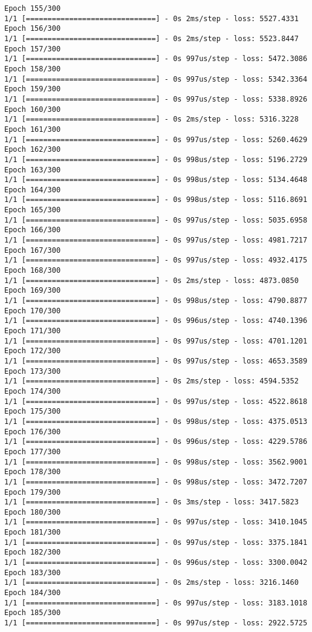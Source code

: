\documentclass[11pt]{article}
\begin{document}
\begin{Verbatim}[commandchars=\\\{\}]
Epoch 155/300
1/1 [==============================] - 0s 2ms/step - loss: 5527.4331
Epoch 156/300
1/1 [==============================] - 0s 2ms/step - loss: 5523.8447
Epoch 157/300
1/1 [==============================] - 0s 997us/step - loss: 5472.3086
Epoch 158/300
1/1 [==============================] - 0s 997us/step - loss: 5342.3364
Epoch 159/300
1/1 [==============================] - 0s 997us/step - loss: 5338.8926
Epoch 160/300
1/1 [==============================] - 0s 2ms/step - loss: 5316.3228
Epoch 161/300
1/1 [==============================] - 0s 997us/step - loss: 5260.4629
Epoch 162/300
1/1 [==============================] - 0s 998us/step - loss: 5196.2729
Epoch 163/300
1/1 [==============================] - 0s 998us/step - loss: 5134.4648
Epoch 164/300
1/1 [==============================] - 0s 998us/step - loss: 5116.8691
Epoch 165/300
1/1 [==============================] - 0s 997us/step - loss: 5035.6958
Epoch 166/300
1/1 [==============================] - 0s 997us/step - loss: 4981.7217
Epoch 167/300
1/1 [==============================] - 0s 997us/step - loss: 4932.4175
Epoch 168/300
1/1 [==============================] - 0s 2ms/step - loss: 4873.0850
Epoch 169/300
1/1 [==============================] - 0s 998us/step - loss: 4790.8877
Epoch 170/300
1/1 [==============================] - 0s 996us/step - loss: 4740.1396
Epoch 171/300
1/1 [==============================] - 0s 997us/step - loss: 4701.1201
Epoch 172/300
1/1 [==============================] - 0s 997us/step - loss: 4653.3589
Epoch 173/300
1/1 [==============================] - 0s 2ms/step - loss: 4594.5352
Epoch 174/300
1/1 [==============================] - 0s 997us/step - loss: 4522.8618
Epoch 175/300
1/1 [==============================] - 0s 998us/step - loss: 4375.0513
Epoch 176/300
1/1 [==============================] - 0s 996us/step - loss: 4229.5786
Epoch 177/300
1/1 [==============================] - 0s 998us/step - loss: 3562.9001
Epoch 178/300
1/1 [==============================] - 0s 998us/step - loss: 3472.7207
Epoch 179/300
1/1 [==============================] - 0s 3ms/step - loss: 3417.5823
Epoch 180/300
1/1 [==============================] - 0s 997us/step - loss: 3410.1045
Epoch 181/300
1/1 [==============================] - 0s 997us/step - loss: 3375.1841
Epoch 182/300
1/1 [==============================] - 0s 996us/step - loss: 3300.0042
Epoch 183/300
1/1 [==============================] - 0s 2ms/step - loss: 3216.1460
Epoch 184/300
1/1 [==============================] - 0s 997us/step - loss: 3183.1018
Epoch 185/300
1/1 [==============================] - 0s 997us/step - loss: 2922.5725

\end{Verbatim}
\end{document}
